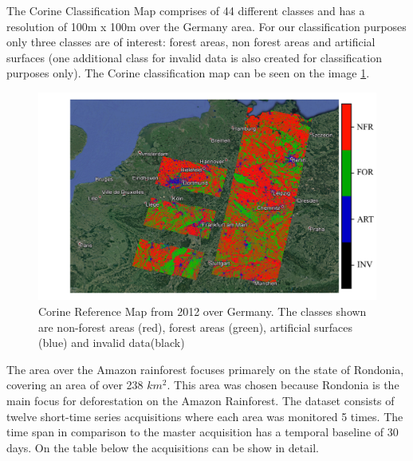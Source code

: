 The Corine Classification Map comprises of 44 different classes and has a resolution of 100m x 100m over the Germany area. For our classification purposes only three classes are of interest: forest areas, non forest areas and artificial surfaces (one additional class for invalid data is also created for classification purposes only). The Corine classification map can be seen on the image \ref{fig:corine}.

\begin{figure}[H]
    \centering
    \includegraphics[width=0.7\linewidth]{Cap3/corine.png}
    \caption{Corine Reference Map from 2012 over Germany. The classes shown are non-forest areas (red), forest areas (green), artificial surfaces (blue) and invalid data(black)}
    \label{fig:corine}
\end{figure}

The area over the Amazon rainforest focuses primarely on the state of Rondonia, covering an area of over 238 $km^2$. This area was chosen because Rondonia is the main focus for deforestation on the Amazon Rainforest. The dataset consists of twelve short-time series acquisitions where each area was monitored 5 times. The time span in comparison to the master acquisition has a temporal baseline of 30 days. On the table below the acquisitions can be show in detail.

